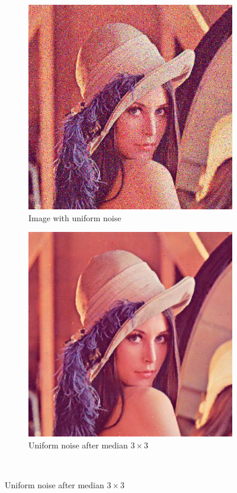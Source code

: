 \documentclass[12pt]{article}
\theoremstyle{definition}
\begin{document}
\begin{figure}[ht]\centering
    \begin{subfigure}[t]{.4\textwidth}\centering
        \includegraphics[width=.8\textwidth]{lenac_uniform3}
        \caption{Image with uniform noise}
    \end{subfigure}
    \begin{subfigure}[t]{.4\textwidth}\centering
        \includegraphics[width=.8\textwidth]{lenac_uniform_median}
        \caption{Uniform noise after median $3\times3$}
    \end{subfigure}\\[2em]

\end{figure}
\end{document}
